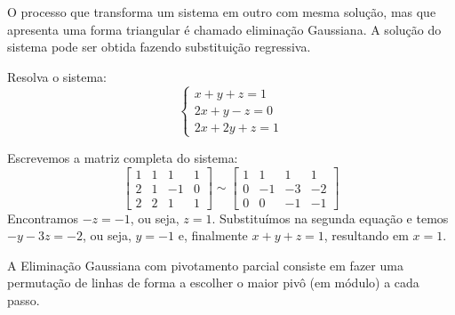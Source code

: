 O processo que transforma um sistema em outro com mesma solução, mas que apresenta uma forma triangular é chamado eliminação Gaussiana. A solução do sistema pode ser obtida fazendo substituição regressiva.
\begin{ex} Resolva o sistema:
  \begin{equation*}
    \left\{\begin{array}{c}
        x+y+z=1\\
        2x+y-z=0\\
        2x+2y+z=1
      \end{array}\right.  
  \end{equation*}
\end{ex}
\begin{sol}
Escrevemos a matriz completa do sistema:
\begin{equation*}
  \left[\begin{array}{ccc|c}
      1 &1& 1&1\\
      2 &1& -1&0\\
      2 & 2 &1&1
    \end{array}\right] \sim 
  \left[\begin{array}{ccc|c}
      1 &1& 1&1\\
      0 &-1& -3&-2\\
      0 & 0 &-1&-1
    \end{array}\right]
\end{equation*}
Encontramos $-z=-1$, ou seja, $z=1$. Substituímos na segunda equação e temos $-y-3z=-2$, ou seja, $y=-1$ e, finalmente $x+y+z=1$, resultando em $x=1$.
\end{sol}

A Eliminação Gaussiana com pivotamento parcial consiste em fazer uma permutação de linhas de forma a escolher o maior pivô (em módulo) a cada passo.

